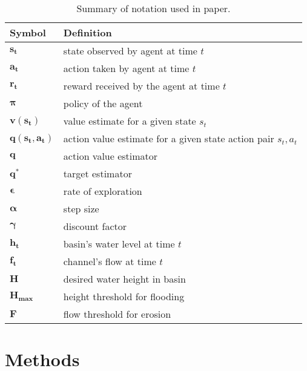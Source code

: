 \begin{table}[H]
\centering
\begin{tabular}{|l|p{}|}
\hline
\textbf{Symbol} & \textbf{Definition} \\
\hline
$ \boldsymbol{s_t} $        & state observed by agent at time $t$    \\
$ \boldsymbol{a_t} $        & action taken by agent at time $t$           \\
$ \boldsymbol{r_t} $        & reward received by the agent at time $t$    \\
$ \boldsymbol{\pi} $        & policy of the agent \\
$ \boldsymbol{v(s_t)} $     & value estimate for a given state $s_t$ \\
$ \boldsymbol{q(s_t,a_t)} $ & action value estimate for a given state action pair $s_t,a_t$ \\
$ \boldsymbol{q} $          & action value estimator\\
$ \boldsymbol{q^*} $        & target estimator \\
$ \boldsymbol{\epsilon} $   & rate of exploration \\
$ \boldsymbol{\alpha} $     & step size \\
$ \boldsymbol{\gamma} $     & discount factor \\
$ \boldsymbol{h_t} $        & basin's water level at time $t$\\
$ \boldsymbol{f_t} $        & channel's flow at time $t$ \\
$ \boldsymbol{H} $          & desired water height in basin\\
$ \boldsymbol{H_{max}} $    & height threshold for flooding\\
$ \boldsymbol{F} $          & flow threshold for erosion\\
\hline
\end{tabular}
\caption{Summary of notation used in paper.}
\end{table}

\section{Methods}
